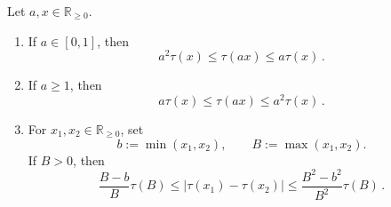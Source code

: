 \documentclass{article}
\newcommand{\R}{\mathbb{R}}
\newcommand{\Rp}{\R_{\geq0}}
\newcommand{\lb}{\left(} %
\newcommand{\rb}{\right)} %
\newcommand{\br}[1]{\lb #1 \rb} %
\newcommand{\brOf}[1]{\!\br{#1}} %
\newcommand{\absof}[1]{\vert #1 \vert} %
\newcommand{\eqfs}{\,.}
\newcommand{\tran}{\tau}
\begin{document}
\begin{lemma}\label{lmm:tran:factor}
    Let $a,x\in\Rp$.
    \begin{enumerate}[label=(\roman*)]
        \item If $a\in[0,1]$, then
        \begin{equation}\label{eq:tran:factor:small}
            a^2\tran(x)
            \leq
            \tran(ax)
            \leq
            a\tran(x)
            \eqfs
        \end{equation}
        
        \item If $a\geq1$, then
        \begin{equation}\label{eq:tran:factor:large}
            a\tran(x)
            \leq
            \tran(ax)
            \leq
            a^2\tran(x)
            \eqfs
        \end{equation}
        
        \item For $x_1,x_2\in\Rp$, set
        \begin{equation}
            b:=\min\brOf{x_1,x_2},
            \qquad
            B:=\max\brOf{x_1,x_2}.
        \end{equation}
        If $B>0$, then
        \begin{equation}\label{eq:tran:diff:tran}
            \frac{B-b}{B}\tran(B)
            \leq
            \absof{\tran(x_1)-\tran(x_2)}
            \leq
            \frac{B^2-b^2}{B^2}\tran(B)
            \eqfs
        \end{equation}
    \end{enumerate}
\end{lemma}
%
\end{document}
